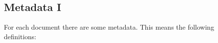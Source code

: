 
\newpage
\subsection{Metadata I}\label{subsec:Metadata-I}

For each document there are some metadata. This means the following definitions:

